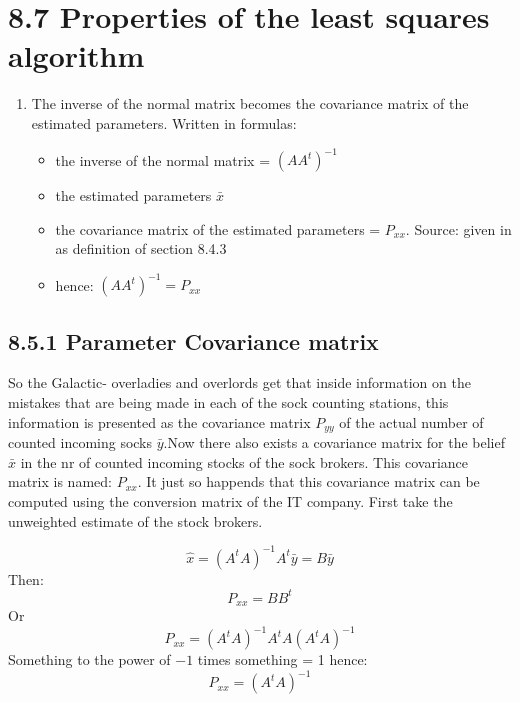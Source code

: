 \section{8.7 Properties of the least squares algorithm}
\begin{enumerate}
    \item The inverse of the normal matrix becomes the covariance matrix of the estimated parameters. Written in formulas:
    \begin{itemize}
        \item the inverse of the normal matrix = ${(AA^t)}^{-1}$
        \item the estimated parameters $\bar{x}$
        \item the covariance matrix of the estimated parameters = $P_{xx}$. Source: given in as definition of section 8.4.3
        \item hence: ${(AA^t)}^{-1}=P_{xx}$
    \end{itemize}
\end{enumerate}

\subsection{8.5.1 Parameter Covariance matrix}
So the Galactic- overladies and overlords get that inside information on the mistakes that are being made in each of the sock counting stations, this information is presented as the covariance matrix $P_{yy}$ of the actual number of counted incoming socks $\bar{y}$.Now there also exists a covariance matrix for the belief $\bar{x}$ in the nr of counted incoming stocks of the sock brokers. This covariance matrix is named: $P_{xx}$. It just so happends that this covariance matrix can be computed using the conversion matrix of the IT company. First take the unweighted estimate of the stock brokers.

\begin{equation}
    \hat{x}   = {(A^tA)}^{-1}A^t\bar{y}=B\bar{y}
\end{equation}
Then: 
\begin{equation}
    P_{xx}=BB^t
\end{equation}
Or
\begin{equation}
    P_{xx}={(A^tA)}^{-1}A^tA{(A^tA)}^{-1}
\end{equation}
Something to the power of $-1$ times something = 1 hence:
\begin{equation}
    P_{xx}={(A^tA)}^{-1}
\end{equation}

